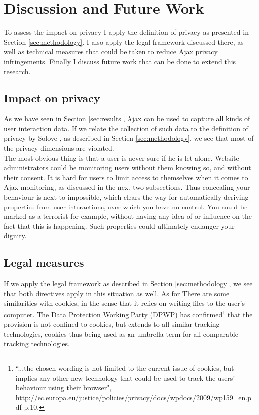 \section{Discussion and Future Work}
\label{sec:discussion}
To assess the impact on privacy I apply the definition of privacy as presented in Section \ref{sec:methodology}. I also apply the legal framework discussed there, as well as technical measures that could be taken to reduce Ajax privacy infringements. Finally I discuss future work that can be done to extend this research.

\subsection{Impact on privacy}
As we have seen in Section \ref{sec:results}, Ajax can be used to capture all kinds of user interaction data.  If we relate the collection of such data to the definition of privacy by Solove  \cite{solove2002conceptualizing}, as described in Section \ref{sec:methodology}, we see that most of the privacy dimensions are violated.\\

The most obvious thing is that a user is never sure if he is let alone. Website administrators could be monitoring users without them knowing so, and without their consent. It is hard for users to limit access to themselves when it comes to Ajax monitoring, as discussed in the next two subsections. Thus concealing your behaviour is next to impossible, which clears the way for automatically deriving properties from user interactions, over which you have no control. You could be marked as a terrorist for example, without having any idea of or influence on the fact that this is happening. Such properties could ultimately endanger your dignity. 

\subsection{Legal measures}
If we apply the legal framework as described in Section \ref{sec:methodology}, we see that both directives apply in this situation as well. As for There are some similarities with cookies, in the sense that it relies on writing files to the user's computer. The Data Protection Working Party (DPWP) has confirmed\footnote{``...the chosen wording is not limited to the current issue of cookies, but implies any other new technology that could be used to track the users’ behaviour using their browser", http://ec.europa.eu/justice/policies/privacy/docs/wpdocs/2009/wp159\_en.pdf p.10.} that the provision is not confined to cookies, but extends to all similar tracking technologies, cookies thus being used as an umbrella term for all comparable tracking technologies. 

